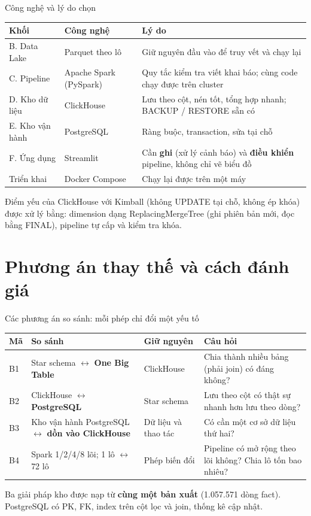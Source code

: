 \documentclass[aspectratio=169,11pt]{beamer}
\begin{document}
\begin{frame}{Công nghệ và lý do chọn}
  \footnotesize
  \begin{tabular}{L{2.2cm} L{3.2cm} L{7.2cm}}
    \toprule
    \textbf{Khối} & \textbf{Công nghệ} & \textbf{Lý do} \\
    \midrule
    B. Data Lake & Parquet theo lô & Giữ nguyên đầu vào để truy vết và chạy lại \\
    C. Pipeline & Apache Spark (PySpark) & Quy tắc kiểm tra viết khai báo; cùng code chạy được trên cluster \\
    D. Kho dữ liệu & ClickHouse & Lưu theo cột, nén tốt, tổng hợp nhanh; BACKUP / RESTORE sẵn có \\
    E. Kho vận hành & PostgreSQL & Ràng buộc, transaction, sửa tại chỗ \\
    F. Ứng dụng & Streamlit & Cần \textbf{ghi} (xử lý cảnh báo) và \textbf{điều khiển} pipeline, không chỉ vẽ biểu đồ \\
    Triển khai & Docker Compose & Chạy lại được trên một máy \\
    \bottomrule
  \end{tabular}
  \bigskip

  \small Điểm yếu của ClickHouse với Kimball (không UPDATE tại chỗ, không ép khóa) được xử lý bằng: dimension dạng ReplacingMergeTree (ghi phiên bản mới, đọc bằng FINAL), pipeline tự cấp và kiểm tra khóa.
\end{frame}

\section{Phương án thay thế và cách đánh giá}

\begin{frame}{Các phương án so sánh: mỗi phép chỉ đổi một yếu tố}
  \footnotesize
  \begin{tabular}{l L{3.4cm} L{2.3cm} L{5.8cm}}
    \toprule
    \textbf{Mã} & \textbf{So sánh} & \textbf{Giữ nguyên} & \textbf{Câu hỏi} \\
    \midrule
    B1 & Star schema $\leftrightarrow$ \textbf{One Big Table} & ClickHouse & Chia thành nhiều bảng (phải join) có đáng không? \\
    B2 & ClickHouse $\leftrightarrow$ \textbf{PostgreSQL} & Star schema & Lưu theo cột có thật sự nhanh hơn lưu theo dòng? \\
    B3 & Kho vận hành PostgreSQL $\leftrightarrow$ \textbf{dồn vào ClickHouse} & Dữ liệu và thao tác & Có cần một cơ sở dữ liệu thứ hai? \\
    B4 & Spark 1/2/4/8 lõi; 1 lô $\leftrightarrow$ 72 lô & Phép biến đổi & Pipeline có mở rộng theo lõi không? Chia lô tốn bao nhiêu? \\
    \bottomrule
  \end{tabular}
  \bigskip

  \small Ba giải pháp kho được nạp từ \textbf{cùng một bản xuất} (1.057.571 dòng fact). PostgreSQL có PK, FK, index trên cột lọc và join, thống kê cập nhật.
\end{frame}
\end{document}

